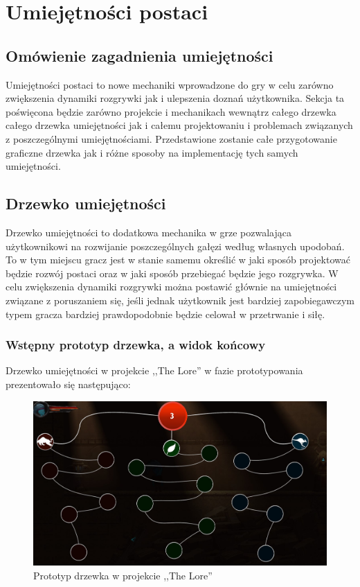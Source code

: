 \documentclass[oneside,polski,logo]{amuthesis}
\begin{document}
\section{Umiejętności postaci}
\subsection{Omówienie zagadnienia umiejętności}
Umiejętności postaci to nowe mechaniki wprowadzone do gry w celu zarówno zwiększenia dynamiki rozgrywki jak i ulepszenia doznań użytkownika. Sekcja ta poświęcona będzie zarówno projekcie i mechanikach wewnątrz całego drzewka całego drzewka umiejętności jak i całemu projektowaniu i problemach związanych z poszczególnymi umiejętnościami. Przedstawione zostanie całe przygotowanie graficzne drzewka jak i różne sposoby na implementację tych samych umiejętności.
\subsection{Drzewko umiejętności}
Drzewko umiejętności to dodatkowa mechanika w grze pozwalająca użytkownikowi na rozwijanie poszczególnych gałęzi według własnych upodobań. To w tym miejscu gracz jest w stanie samemu określić w jaki sposób projektować będzie rozwój postaci oraz w jaki sposób przebiegać będzie jego rozgrywka. W celu zwiększenia dynamiki rozgrywki można postawić głównie na umiejętności związane z poruszaniem się, jeśli jednak użytkownik jest bardziej zapobiegawczym typem gracza bardziej prawdopodobnie będzie celował w przetrwanie i siłę. 
\subsubsection{Wstępny prototyp drzewka, a widok końcowy}
Drzewko umiejętności w projekcie ,,The Lore'' w fazie prototypowania prezentowało się następująco:

\begin{figure}[h]
	\centering
	\includegraphics[width=13cm]{images/kozubal/drzewkoPrototyp.jpg}
	\caption{Prototyp drzewka w projekcie ,,The Lore''}
\end{figure}
\end{document}
